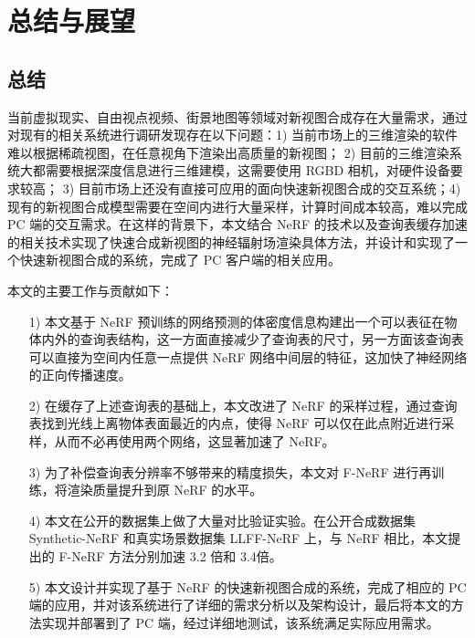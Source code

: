 \chapter{总结与展望}
\section{总结}
当前虚拟现实、自由视点视频、街景地图等领域对新视图合成存在大量需求，通过对现有的相关系统进行调研发现存在以下问题：1) 当前市场上的三维渲染的软件难以根据稀疏视图，在任意视角下渲染出高质量的新视图；
2) 目前的三维渲染系统大都需要根据深度信息进行三维建模，这需要使用 RGBD 相机，对硬件设备要求较高；
3) 目前市场上还没有直接可应用的面向快速新视图合成的交互系统；4) 现有的新视图合成模型需要在空间内进行大量采样，计算时间成本较高，难以完成 PC 端的交互需求。在这样的背景下，本文结合 NeRF 的技术以及查询表缓存加速的相关技术实现了快速合成新视图的神经辐射场渲染具体方法，并设计和实现了一个快速新视图合成的系统，完成了 PC 客户端的相关应用。

本文的主要工作与贡献如下：

\begin{enumerate}
	\item [1)] 本文基于 NeRF 预训练的网络预测的体密度信息构建出一个可以表征在物体内外的查询表结构，这一方面直接减少了查询表的尺寸，另一方面该查询表可以直接为空间内任意一点提供 NeRF 网络中间层的特征，这加快了神经网络的正向传播速度。
	\item [2)] 在缓存了上述查询表的基础上，本文改进了 NeRF 的采样过程，通过查询表找到光线上离物体表面最近的内点，使得 NeRF 可以仅在此点附近进行采样，从而不必再使用两个网络，这显著加速了 NeRF。
	\item [3)] 为了补偿查询表分辨率不够带来的精度损失，本文对 F-NeRF 进行再训练，将渲染质量提升到原 NeRF 的水平。
	\item [4)] 本文在公开的数据集上做了大量对比验证实验。在公开合成数据集 Synthetic-NeRF 和真实场景数据集 LLFF-NeRF 上，与 NeRF 相比，本文提出的 F-NeRF 方法分别加速 3.2 倍和 3.4倍。 
	\item [5)] 本文设计并实现了基于 NeRF 的快速新视图合成的系统，完成了相应的 PC 端的应用，并对该系统进行了详细的需求分析以及架构设计，最后将本文的方法实现并部署到了 PC 端，经过详细地测试，该系统满足实际应用需求。
\end{enumerate}


